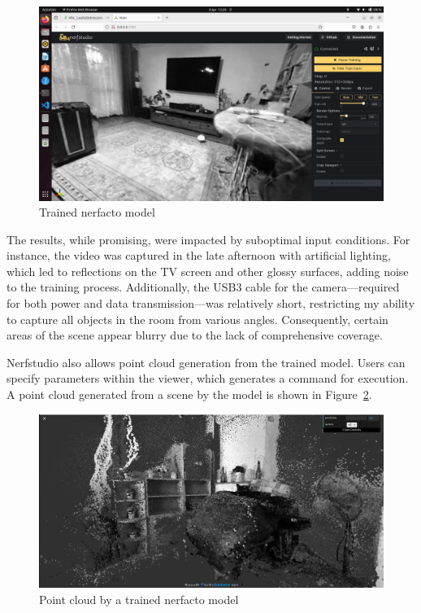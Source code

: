 \begin{figure}[htbp]
	\centering
	\includegraphics[width=150mm, keepaspectratio]{figures_jpg/trained_nerf_karcag1.jpg}
	\caption{Trained nerfacto model}
	\label{fig:trained_nerf_karcag}
\end{figure}

The results, while promising, were impacted by suboptimal input conditions. For instance, the video was captured in the late afternoon with artificial lighting, which led to reflections on the TV screen and other glossy surfaces, adding noise to the training process. Additionally, the USB3 cable for the camera—required for both power and data transmission—was relatively short, restricting my ability to capture all objects in the room from various angles. Consequently, certain areas of the scene appear blurry due to the lack of comprehensive coverage.

Nerfstudio also allows point cloud generation from the trained model. Users can specify parameters within the viewer, which generates a command for execution. A point cloud generated from a scene by the model is shown in Figure~\ref{fig:nerfstudio_point_cloud}.

\begin{figure}[htbp]
	\centering
	\includegraphics[width=150mm, keepaspectratio]{figures_jpg/nerfacto_point_cloud1.jpg}
	\caption{Point cloud by a trained nerfacto model}
	\label{fig:nerfstudio_point_cloud}
\end{figure}

